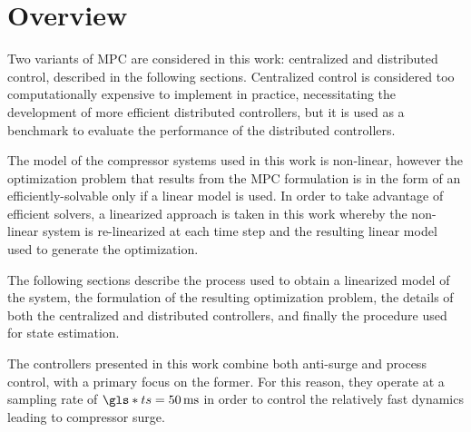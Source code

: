 \section{Overview}

Two variants of MPC are considered in this work: centralized and distributed control, described in the following sections.
Centralized control is considered too computationally expensive to implement in practice, necessitating the development of more efficient distributed controllers, but it is used as a benchmark to evaluate the performance of the distributed controllers.

The model of the compressor systems used in this work is non-linear, however the optimization problem that results from the MPC formulation is in the form of an efficiently-solvable  only if a linear model is used.
In order to take advantage of efficient  solvers, a linearized approach is taken in this work whereby the non-linear system is re-linearized at each time step and the resulting linear model used to generate the optimization. 

The following sections describe the process used to obtain a linearized model of the system, the formulation of the resulting optimization problem, the details of both the centralized and distributed controllers, and finally the procedure used for state estimation.

The controllers presented in this work combine both anti-surge and process control, with a primary focus on the former. 
For this reason, they operate at a sampling rate of $\g{ts} = \u{50}{ms}$ in order to control the relatively fast dynamics leading to compressor surge.

